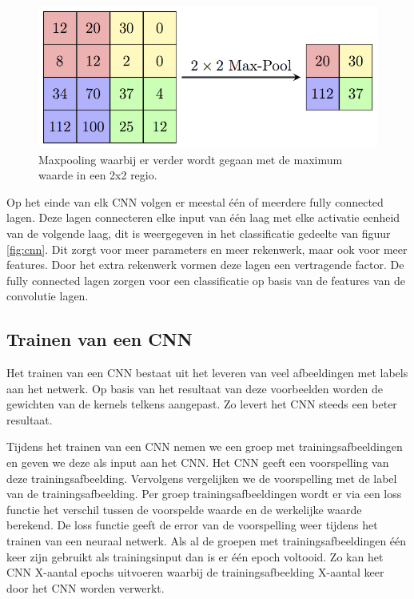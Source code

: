 \begin{figure}[!ht]
	\centering
	\includegraphics[width=0.5\linewidth]{fig/Maxpool.png}
	\caption{Maxpooling waarbij er verder wordt gegaan met de maximum waarde in een 2x2 regio.}
	\label{fig:maxpool}
\end{figure}

Op het einde van elk CNN volgen er meestal \'e\'en of meerdere fully connected lagen. 
Deze lagen connecteren elke input van \'e\'en laag met elke activatie eenheid van de volgende laag, dit is weergegeven in het classificatie gedeelte van figuur \ref{fig:cnn}. 
Dit zorgt voor meer parameters en meer rekenwerk, maar ook voor meer features.
Door het extra rekenwerk vormen deze lagen een vertragende factor. 
De fully connected lagen zorgen voor een classificatie op basis van de features van de convolutie lagen.

\subsection{Trainen van een CNN} \label{train}
Het trainen van een CNN bestaat uit het leveren van veel afbeeldingen met labels aan het netwerk. 
Op basis van het resultaat van deze voorbeelden worden de gewichten van de kernels telkens aangepast.
Zo levert het CNN steeds een beter resultaat. 

Tijdens het trainen van een CNN nemen we een groep met trainingsafbeeldingen en geven we deze als input aan het CNN.
Het CNN geeft een voorspelling van deze trainingsafbeelding.
Vervolgens vergelijken we de voorspelling met de label van de trainingsafbeelding.
Per groep trainingsafbeeldingen wordt er via een loss functie het verschil tussen de voorspelde waarde en de werkelijke waarde berekend.
De loss functie geeft de error van de voorspelling weer tijdens het trainen van een neuraal netwerk. 
Als al de groepen met trainingsafbeeldingen \'e\'en keer zijn gebruikt als trainingsinput dan is er \'e\'en epoch voltooid.
Zo kan het CNN X-aantal epochs uitvoeren waarbij de trainingsafbeelding X-aantal keer door het CNN worden verwerkt.

